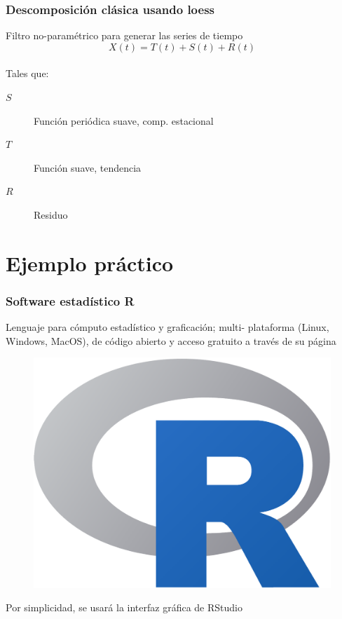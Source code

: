 \documentclass[serif,mathserif,professionalfont]{beamer}
\begin{document}
\begin{frame}\frametitle{Descomposición clásica usando loess}

Filtro no-paramétrico para generar las series de tiempo
\begin{equation*}
X(t) = T(t) + S(t) + R(t)
\end{equation*}\\

Tales que:\\
\begin{description}
\item[$S$] Función periódica suave, comp. estacional
\item[$T$] Función suave, tendencia
\item[$R$] Residuo
\end{description}

\end{frame}




\section{Ejemplo práctico}

\begin{frame}\frametitle{Software estadístico R}

Lenguaje para cómputo estadístico y graficación; multi- plataforma (Linux, Windows, MacOS), 
de código abierto y acceso gratuito a través de su página
\href{https://www.r-project.org/}{}

\begin{figure}
\centering
\includegraphics[width=0.4\linewidth]{./curso_scripts/r_logo.pdf}
\end{figure}

Por simplicidad, se usará la interfaz gráfica de RStudio
\href{https://www.rstudio.com/}{}
\end{frame}
\end{document}
